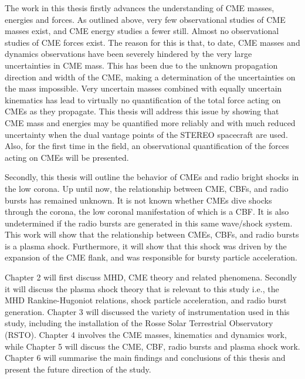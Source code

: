The work in this thesis firstly advances the understanding of CME masses, energies and forces. As outlined above, very few observational studies of CME masses exist, and CME energy studies a fewer still. Almost no observational studies of CME forces exist. The reason for this is that, to date, CME masses and dynamics observations have been severely hindered by the very large uncertainties in CME mass. This has been due to the unknown propagation direction and width of the CME, making a determination of the uncertainties on the mass impossible. Very uncertain masses combined with equally uncertain kinematics has lead to virtually no quantification of the total force acting on CMEs as they propagate. This thesis will address this issue by showing that CME mass and energies may be quantified more reliably and with much reduced uncertainty when the dual vantage points of the STEREO spacecraft are used. Also, for the first time in the field, an observational quantification of the forces acting on CMEs will be presented. 

Secondly, this thesis will outline the behavior of CMEs and radio bright shocks in the low corona. Up until now, the relationship between CME, CBFs, and radio bursts has remained unknown. It is not known whether CMEs dive shocks through the corona, the low coronal manifestation of which is a CBF. It is also undetermined if the radio bursts are generated in this same wave/shock system. This work will show that the relationship between CMEs, CBFs, and radio bursts is a plasma shock. Furthermore, it will show that this shock was driven by the expansion of the CME flank, and was responsible for bursty particle acceleration.

Chapter 2 will first discuss MHD, CME theory and related phenomena. Secondly it will discuss the plasma shock theory that is relevant to this study i.e., the MHD Rankine-Hugoniot relations, shock particle acceleration, and radio burst generation. Chapter 3 will discussed the variety of instrumentation used in this study, including the installation of the Rosse Solar Terrestrial Observatory (RSTO). Chapter 4 involves the CME masses, kinematics and dynamics work, while Chapter 5 will discuss the CME, CBF, radio bursts and plasma shock work. Chapter 6 will summarise the main findings and conclusions of this thesis and present the future direction of the study.
